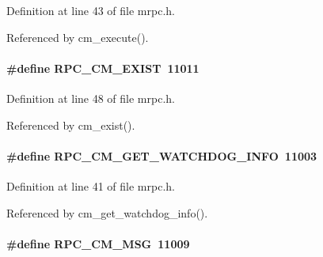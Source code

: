 Definition at line 43 of file mrpc.h.

Referenced by cm\_\-execute().
\paragraph[{RPC\_\-CM\_\-EXIST}]{\setlength{\rightskip}{0pt plus 5cm}\#define RPC\_\-CM\_\-EXIST~11011}\hfill\label{group__mrpcdefineh_ga0d45be0755215931e2d4aceb91df38cf}

\begin{DoxyItemize}
\item 
\end{DoxyItemize}

Definition at line 48 of file mrpc.h.

Referenced by cm\_\-exist().
\paragraph[{RPC\_\-CM\_\-GET\_\-WATCHDOG\_\-INFO}]{\setlength{\rightskip}{0pt plus 5cm}\#define RPC\_\-CM\_\-GET\_\-WATCHDOG\_\-INFO~11003}\hfill\label{group__mrpcdefineh_gaf64b3d2c73048e4ca07a5aa8bb70c326}

\begin{DoxyItemize}
\item 
\end{DoxyItemize}

Definition at line 41 of file mrpc.h.

Referenced by cm\_\-get\_\-watchdog\_\-info().
\paragraph[{RPC\_\-CM\_\-MSG}]{\setlength{\rightskip}{0pt plus 5cm}\#define RPC\_\-CM\_\-MSG~11009}\hfill\label{group__mrpcdefineh_ga61050d4425a71753c645d94cb280d7f6}

\begin{DoxyItemize}
\item 
\end{DoxyItemize}

